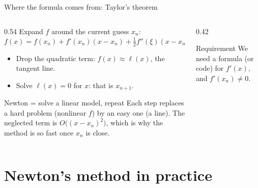 \documentclass[aspectratio=169]{beamer}
\begin{document}
\begin{frame}{Where the formula comes from: Taylor's theorem}
\begin{columns}[T]
\begin{column}{0.54\textwidth}
\small
Expand $f$ around the current guess $x_n$:
\[
f(x) = f(x_n) + f'(x_n)(x - x_n) + \tfrac12 f''(\xi)(x - x_n)^2 .
\]
\begin{itemize}
  \item Drop the quadratic term: $f(x) \approx \ell(x)$, the tangent line.
  \item Solve $\ell(x) = 0$ for $x$: that is $x_{n+1}$.
\end{itemize}
\vspace{0.1cm}
\begin{block}{Newton = solve a linear model, repeat}
Each step replaces a hard problem (nonlinear $f$) by an easy one (a line). The neglected term is $O\big((x - x_n)^2\big)$, which is why the method is so fast once $x_n$ is close.
\end{block}
\end{column}
\begin{column}{0.42\textwidth}
\begin{alertblock}{Requirement}
\footnotesize We need a formula (or code) for $f'(x)$, and $f'(x_n) \neq 0$.
\end{alertblock}
\end{column}
\end{columns}
\end{frame}

\section{Newton's method in practice}
\end{document}
